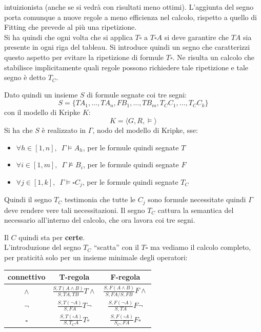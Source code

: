 \documentclass[a4paper,12pt, oneside]{book}
\begin{document}
intuizionista (anche se si vedrà con risultati meno ottimi). L'aggiunta del
segno porta comunque a nuove regole a meno efficienza nel calcolo, rispetto a
quello di Fitting che prevede al più una ripetizione.\\
Si ha quindi che ogni
volta che si applica $T\square$ a $T\square A$ si deve garantire che $TA$ sia
presente in ogni riga del tableau. Si introduce quindi un segno che
caratterizzi questo aspetto per evitare la ripetizione di formule $T\square$. Ne
risulta un calcolo che stabilisce implicitamente quali regole possono richiedere
tale ripetizione e tale segno è detto $T_C$.
\begin{definizione}
  Dato quindi un insieme $S$ di formule segnate coi tre segni:
  \[S=\{TA_1,\ldots, TA_n,FB_1,\ldots, TB_m,T_CC_1,\ldots, T_CC_k\}\]
  con il modello di Kripke $K$:
  \[K=\langle G,R,\vDash\rangle\]
  Si ha che $S$ è realizzato in $\Gamma$, nodo del modello di Kripke, sse:
  \begin{itemize}
    \item $\forall h\in [1,n],\,\,\,\Gamma\vDash A_h$, per le formule quindi
    segnate $T$
    \item $\forall i\in [1,m],\,\,\,\Gamma\nvDash B_i$, per le formule quindi
    segnate $F$
    \item $\forall j\in [1,k],\,\,\,\Gamma\vDash \square C_j$, per le formule
    quindi segnate $T_C$
  \end{itemize}
  Quindi il segno $T_C$ testimonia che tutte le $C_j$ sono formule necessitate
  quindi $\Gamma$ deve rendere vere tali necessitazioni. Il segno $T_C$ cattura
  la semantica del necessario all'interno del calcolo, che ora lavora coi tre
  segni. 
\end{definizione}
Il $C$ quindi sta per \textbf{certe}.\\
L'introduzione del segno $T_C$ ``scatta'' con il $T\square$ ma vediamo il
calcolo completo, per praticità solo per un insieme minimale degli operatori:
\begin{table}[H]
  \Large
  \centering
  \begin{tabular}{c||c|c}
    connettivo& T-regola& F-regola\\
    \hline
    \hline
    $\land$ & $\frac{S,T(A\land B)}{S,TA,TB}T\land$&
                        $\frac{S,F(A\land B)}{S,FA/S,FB}F\land$\\
    \hline
    $\neg$ & $\frac{S,T(\neg A)}{S,FA}T\neg$&
                        $\frac{S,F(\neg A)}{S,TA}F\neg$\\
    \hline
    $\square$ & $\frac{S,T(\square A)}{S,T_CA}T\square$&
                        $\frac{S,F(\square A)}{S_C,FA}F\square$\\
  \end{tabular}
\end{table}
\end{document}
